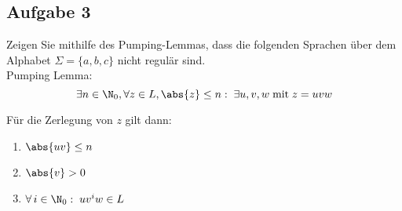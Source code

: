 \subsection*{Aufgabe 3}
  Zeigen Sie mithilfe des Pumping-Lemmas, dass die folgenden Sprachen über dem
Alphabet $\Sigma = \{a, b, c\}$ nicht regulär sind. \\

Pumping Lemma:
\[ \exists n \in \N_0, \forall z \in L, \abs{z} \leq n: \;
 \exists u,v,w \; \text{mit} \; z = uvw \]

Für die Zerlegung von $z$ gilt dann:
\begin{enumerate}
\item $\abs{uv} \leq n$
\item $ \abs{v} > 0$
\item $\forall \, i \in \N_0: \; uv^i w \in L$
\end{enumerate}

\vspace{1em}

